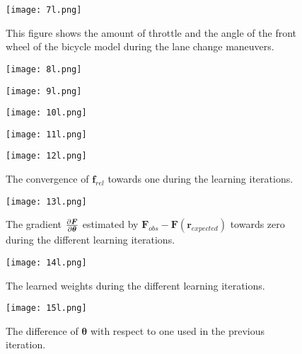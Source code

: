 \begin{figure}[h!]
	\centering
	\texttt{[image: 7l.png]}
	\caption{This figure shows the amount of throttle and the angle of the front wheel of the bicycle model during the lane change maneuvers.}
	\label{fig:app_delta}
\end{figure}


\begin{figure}[h!]
	\centering
	\texttt{[image: 8l.png]}
	\label{fig:lat_acc_val}
\end{figure}


\begin{figure}[h!]
	\centering
	\texttt{[image: 9l.png]}
	\label{fig:lat_acc_val}
\end{figure}


\begin{figure}[h!]
	\centering
	\texttt{[image: 10l.png]}
	\label{fig:lat_acc_val}
\end{figure}


\begin{figure}[h!]
	\centering
	\texttt{[image: 11l.png]}
	\label{fig:lat_acc_val}
\end{figure}



\begin{figure}[h!]
	\centering
	\texttt{[image: 12l.png]}	
	\caption{The convergence of $\bm{f}_{rel}$ towards one during the learning iterations.}
	\label{fig:app_conv}
\end{figure}


\begin{figure}[h!]
	\centering
	\texttt{[image: 13l.png]}
	\caption{The gradient $\pdv{\bm{F}}{\bm{\theta}}$ estimated by $\bm{F}_{obs} - \bm{F}(\bm{r}_{expected})$ towards zero during the different learning iterations. }
	\label{fig:app_grad}
\end{figure}

\begin{figure}[h!]
	\centering
	\texttt{[image: 14l.png]}
	\caption{The learned weights during the different learning iterations.}
	\label{fig:app_weights}
	
\end{figure}


\begin{figure}[h!]
	\centering
	\texttt{[image: 15l.png]}
	\caption{The difference of $\bm{\theta}$ with respect to one used in the previous iteration. }
	\label{fig:app_update}
\end{figure}


